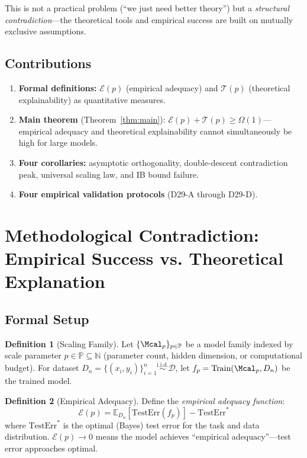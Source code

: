 \documentclass[12pt]{article}
\newcommand{\E}{\mathbb{E}}
\newcommand{\D}{\mathcal{D}}
\theoremstyle{definition}
\newtheorem{definition}{Definition}[section]
\theoremstyle{remark}
\begin{document}
This is not a practical problem (``we just need better theory'') but a \emph{structural contradiction}---the theoretical tools and empirical success are built on mutually exclusive assumptions.

\subsection{Contributions}

\begin{enumerate}
  \item \textbf{Formal definitions:} $\mathcal{E}(p)$ (empirical adequacy) and $\mathcal{T}(p)$ (theoretical explainability) as quantitative measures.
  \item \textbf{Main theorem} (Theorem~\ref{thm:main}): $\mathcal{E}(p) + \mathcal{T}(p) \geq \Omega(1)$---empirical adequacy and theoretical explainability cannot simultaneously be high for large models.
  \item \textbf{Four corollaries:} asymptotic orthogonality, double-descent contradiction peak, universal scaling law, and IB bound failure.
  \item \textbf{Four empirical validation protocols} (D29-A through D29-D).
\end{enumerate}

\section{Methodological Contradiction: Empirical Success vs. Theoretical Explanation}

\subsection{Formal Setup}

\begin{definition}[Scaling Family]\label{def:scaling}
Let $\{\Mcal_p\}_{p \in \mathbb{P}}$ be a model family indexed by scale parameter $p \in \mathbb{P} \subseteq \mathbb{N}$ (parameter count, hidden dimension, or computational budget). For dataset $D_n = \{(x_i, y_i)\}_{i=1}^n \stackrel{\text{i.i.d.}}{\sim} \D$, let $f_p = \text{Train}(\Mcal_p, D_n)$ be the trained model.
\end{definition}

\begin{definition}[Empirical Adequacy]\label{def:empirical}
Define the \emph{empirical adequacy function}:
\begin{equation}
\mathcal{E}(p) = \E_{D_n}[\text{TestErr}(f_p)] - \text{TestErr}^*
\end{equation}
where $\text{TestErr}^*$ is the optimal (Bayes) test error for the task and data distribution. $\mathcal{E}(p) \to 0$ means the model achieves ``empirical adequacy''---test error approaches optimal.
\end{definition}
\end{document}
